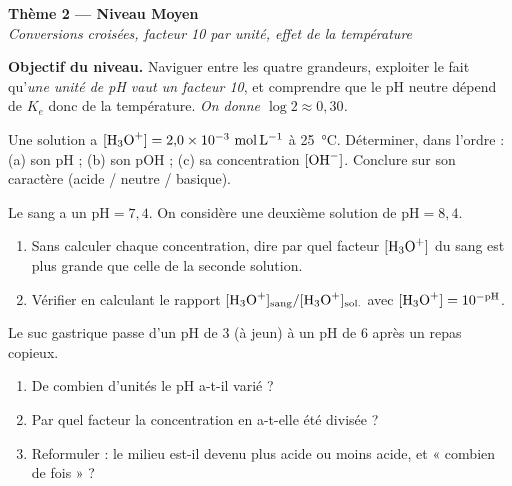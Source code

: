 \documentclass[11pt,a4paper]{article}
\begin{document}
\begin{center}
{\LARGE\bfseries\color{primarydark} Thème 2 --- Niveau Moyen}\\[2pt]
{\color{primary}\itshape Conversions croisées, facteur 10 par unité, effet de la température}
\end{center}

\begin{consigne}
\textbf{Objectif du niveau.} Naviguer entre les quatre grandeurs, exploiter le fait qu'\emph{une unité de pH
vaut un facteur 10}, et comprendre que le pH neutre dépend de $K_e$ donc de la température. \emph{On donne
$\log 2\approx 0{,}30$.}
\end{consigne}

\begin{exobox}
Une solution a $[\ce{H3O+}] = 2{,}0\times10^{-3}\ \si{mol.L^{-1}}$ à \SI{25}{\celsius}. Déterminer, dans
l'ordre : (a) son $\mathrm{pH}$ ; (b) son $\mathrm{pOH}$ ; (c) sa concentration $[\ce{OH-}]$. Conclure sur son
caractère (acide / neutre / basique).
\end{exobox}

\begin{exobox}
Le sang a un $\mathrm{pH} = 7{,}4$. On considère une deuxième solution de $\mathrm{pH} = 8{,}4$.
\begin{enumerate}[label=\alph*),leftmargin=1.6em,itemsep=2pt]
  \item Sans calculer chaque concentration, dire par quel facteur $[\ce{H3O+}]$ du sang est plus grande que
        celle de la seconde solution.
  \item Vérifier en calculant le rapport $[\ce{H3O+}]_{\text{sang}}/[\ce{H3O+}]_{\text{sol.}}$ avec
        $[\ce{H3O+}]=10^{-\mathrm{pH}}$.
\end{enumerate}
\end{exobox}

\begin{exobox}
Le suc gastrique passe d'un $\mathrm{pH}$ de $3$ (à jeun) à un $\mathrm{pH}$ de $6$ après un repas copieux.
\begin{enumerate}[label=\alph*),leftmargin=1.6em,itemsep=2pt]
  \item De combien d'unités le pH a-t-il varié ?
  \item Par quel facteur la concentration en  a-t-elle été divisée ?
  \item Reformuler : le milieu est-il devenu plus acide ou moins acide, et « combien de fois » ?
\end{enumerate}
\end{exobox}
\end{document}

